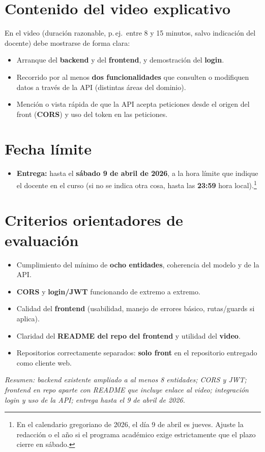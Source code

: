 \documentclass[11pt,a4paper]{article}
\begin{document}
\section{Contenido del video explicativo}

En el video (duración razonable, p.\,ej.\ entre 8 y 15 minutos, salvo indicación del docente) debe mostrarse de forma clara:

\begin{itemize}[leftmargin=*]
  \item Arranque del \textbf{backend} y del \textbf{frontend}, y demostración del \textbf{login}.
  \item Recorrido por al menos \textbf{dos funcionalidades} que consulten o modifiquen datos a través de la API (distintas áreas del dominio).
  \item Mención o vista rápida de que la API acepta peticiones desde el origen del front (\textbf{CORS}) y uso del token en las peticiones.
\end{itemize}

\section{Fecha límite}

\begin{itemize}[leftmargin=*]
  \item \textbf{Entrega:} hasta el \textbf{sábado 9 de abril de 2026}, a la hora límite que indique el docente en el curso (si no se indica otra cosa, hasta las \textbf{23:59} hora local).\footnote{En el calendario gregoriano de 2026, el día 9 de abril es jueves. Ajuste la redacción o el año si el programa académico exige estrictamente que el plazo cierre en sábado.}
\end{itemize}

\section{Criterios orientadores de evaluación}

\begin{itemize}[leftmargin=*]
  \item Cumplimiento del mínimo de \textbf{ocho entidades}, coherencia del modelo y de la API.
  \item \textbf{CORS} y \textbf{login/JWT} funcionando de extremo a extremo.
  \item Calidad del \textbf{frontend} (usabilidad, manejo de errores básico, rutas/guards si aplica).
  \item Claridad del \textbf{README del repo del frontend} y utilidad del \textbf{video}.
  \item Repositorios correctamente separados: \textbf{solo front} en el repositorio entregado como cliente web.
\end{itemize}

\vspace{1.5em}
\noindent\textit{Resumen: backend existente ampliado a al menos 8 entidades; CORS y JWT; frontend en repo aparte con README que incluye enlace al video; integración login y uso de la API; entrega hasta el 9 de abril de 2026.}
\end{document}
